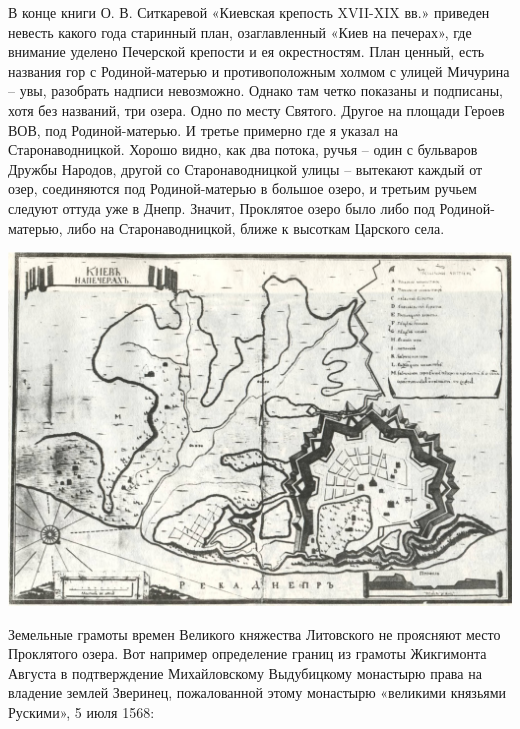В конце книги О. В. Ситкаревой «Киевская крепость XVII-XIX вв.»\cite{sitkareva01} приведен невесть какого года старинный план, озаглавленный «Киев на печерах», где внимание уделено Печерской крепости и ея окрестностям. План ценный, есть названия гор с Родиной-матерью и противоположным холмом с улицей Мичурина – увы, разобрать надписи невозможно. Однако там четко показаны и подписаны, хотя без названий, три озера. Одно по месту Святого. Другое на площади Героев ВОВ, под Родиной-матерью. И третье примерно где я указал на Старонаводницкой. Хорошо видно, как два потока, ручья – один с бульваров Дружбы Народов, другой со Старонаводницкой улицы – вытекают каждый от озер, соединяются под Родиной-матерью в большое озеро, и третьим ручьем следуют оттуда уже в Днепр. Значит, Проклятое озеро было либо под Родиной-матерью, либо на Старонаводницкой, ближе к высоткам Царского села.
\vspace*{\fill}
\begin{center}
\includegraphics[width=\linewidth]{chast-vosp/zver/napecherah.jpg}
\end{center}
\vspace*{\fill}
\newpage

Земельные грамоты времен Великого княжества Литовского не проясняют место Проклятого озера. Вот например определение границ из грамоты Жикгимонта Августа в подтверждение Михайловскому Выдубицкому монастырю права на владение землей Зверинец, пожалованной этому монастырю «великими князьями Рускими», 5 июля 1568:

